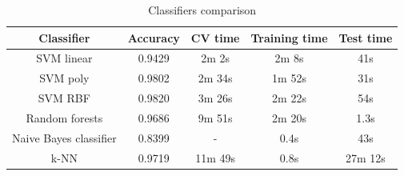 \documentclass[12pt]{article}
\begin{document}
\begin{table}[H]
   \begin{center}
             \begin{tabular}{||c | c | c | c | c ||}
             \hline
             Classifier & Accuracy & CV time  & Training time & Test time  \\ [0.5ex]
             \hline
             SVM linear  & 0.9429 & 2m 2s & 2m 8s & 41s\\ [1ex]
             SVM poly  & 0.9802 & 2m 34s & 1m 52s & 31s\\ [1ex]
             SVM RBF  & 0.9820 & 3m 26s & 2m 22s & 54s\\ [1ex]
             Random forests  & 0.9686 & 9m 51s & 2m 20s & 1.3s\\ [1ex]
             Naive Bayes classifier  & 0.8399 & - & 0.4s & 43s\\ [1ex]
             k-NN  & 0.9719 & 11m 49s & 0.8s & 27m 12s\\ [1ex]
             \hline
             \end{tabular}
             \caption{Classifiers comparison}
             \label{tbl:classifiers_comparison}
   \end{center}
\end{table}
   
\end{document}
